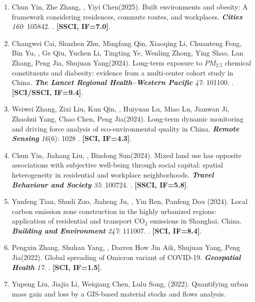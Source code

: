 \begin{enumerate}
    . \textbf{[SCI, IF=8.7]}.
\item
    Chun Yin\CS, Zhe Zhang, \Shaoqing, Yiyi Chen\CS (2025).
    Built environments and obesity: A framework considering residences, commute routes, and workplaces.
    \textbf{\textit{Cities}} \textit{160}: 105842.
    . \textbf{[SSCI, IF=7.0]}.
\item
    Changwei Cai\CF, Shuzhen Zhu\CF, Mingfang Qin\CF, Xiaoqing Li\CF, Chuanteng Feng, Bin Yu, \Shaoqing, Ge Qiu, Yuchen Li, Tingting Ye, Wenling Zhong, Ying Shao, Lan Zhang, Peng Jia\CS, Shujuan Yang\CS (2024).
    Long-term exposure to $PM_{2.5}$ chemical constituents and diabesity: evidence from a multi-center cohort study in China. 
    \textbf{\textit{The Lancet Regional Health–Western Pacific}} \textit{47}: 101100.
    . \textbf{[SCI/SSCI, IF=9.4]}.
\item
    Weiwei Zhang, Zixi Liu, Kun Qin, \Shaoqing, Huiyuan Lu, Miao Lu, Jianwan Ji, Zhaohui Yang, Chao Chen, Peng Jia\CS (2024).
    Long-term dynamic monitoring and driving force analysis of eco-environmental quality in China. 
    \textbf{\textit{Remote Sensing}} \textit{16}(6): 1028
    . \textbf{[SCI, IF=4.3]}.
\item
    Chun Yin, Jiahang Liu, \Shaoqing, Bindong Sun\CS (2024).
    Mixed land use has opposite associations with subjective well-being through social capital: spatial heterogeneity in residential and workplace neighborhoods.
    \textbf{\textit{Travel Behaviour and Society}} \textit{35}: 100724.
    . \textbf{[SSCI, IF=5.8]}.
\item
    Yunfeng Tian, Shudi Zuo\CS, Jiaheng Ju, \Shaoqing, Yin Ren, Panfeng Dou (2024).
    Local carbon emission zone construction in the highly urbanized regions: application of residential and transport CO$_2$ emissions in Shanghai, China.
    \textbf{\textit{Building and Environment}} \textit{247}: 111007.
    . \textbf{[SCI, IF=8.4]}.
\item
    Pengxin Zhang\CF, Shuhan Yang\CF, \Shaoqing, Darren How Jin Aik, Shujuan Yang, Peng Jia\CS (2022).
    Global spreading of Omicron variant of COVID-19.
    \textbf{\textit{Geospatial Health}} \textit{17}.
    . \textbf{[SCI, IF=1.5]}.
\item
    Yupeng Liu\CF, Jiajia Li\CF, Weiqiang Chen\CS, Lulu Song, \Shaoqing \enspace (2022).
    Quantifying urban mass gain and loss by a GIS‐based material stocks and flows analysis.

\end{enumerate}
